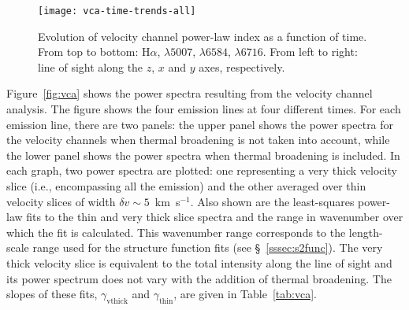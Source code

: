 \documentclass[useAMS,usenatbib]{mn2e}
\begin{document}
  \begin{figure}
  \centering
  \texttt{[image: vca-time-trends-all]}
  \caption{Evolution of velocity channel power-law
    index as a function of time. From top to bottom:   H$\alpha$, \oiii$\lambda 5007$, \nii$\lambda 6584$, \sii$\lambda
  6716$. From left to right: line of sight along the $z$, $x$ and $y$
  axes, respectively.}
  \label{fig:vcatrends}
  \end{figure}

Figure~\ref{fig:vca} shows the power spectra resulting from the
velocity channel analysis. The figure shows the four emission lines at
four different times. For each emission line, there are two panels:
the upper panel shows the power spectra for the velocity channels when
thermal broadening is not taken into account, while the lower panel
shows the power spectra when thermal broadening is included. In each
graph, two power spectra are plotted: one representing a very thick velocity
slice (i.e., encompassing all the emission) and the other averaged
over thin velocity slices
of width $\delta v \sim 5$~km~s$^{-1}$.
Also shown are the least-squares power-law fits to the thin and very
thick slice spectra  and the range in wavenumber over which the fit is
calculated. This
wavenumber range corresponds to the length-scale range used for the
structure function fits (see \S~\ref{sssec:s2func}).
The very thick velocity slice is equivalent to the total
intensity along the line of sight and its power spectrum does not
vary with the addition of thermal broadening.  The slopes of these
fits, $\gamma_{\mathrm{vthick}}$ and $\gamma_{\mathrm{thin}}$, are
given in Table~\ref{tab:vca}.
\end{document}
